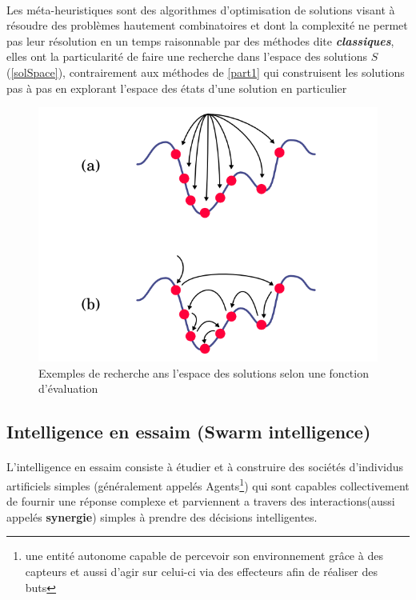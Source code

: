 			\paragraph{}
			Les méta-heuristiques sont des algorithmes d'optimisation de solutions visant à résoudre des problèmes hautement combinatoires et dont la complexité ne permet pas leur résolution en un temps raisonnable par des méthodes dite \textit{\textbf{classiques}}, elles ont la particularité de faire une recherche dans l'espace des solutions $S$(\ref{solSpace}), contrairement aux méthodes de \ref{part1} qui construisent les solutions pas à pas en explorant l'espace des états d'une solution en particulier
			\begin{figure}[H]
				\centering
				\includegraphics[scale=0.25]{images/metHeur.png}
				\caption{Exemples de recherche ans l'espace des solutions selon une fonction d'évaluation}
			\end{figure}
		\noindent
		\subsection{Intelligence en essaim (Swarm intelligence) }
		\paragraph{}
		L'intelligence en essaim consiste à étudier et à construire des sociétés d'individus artificiels simples (généralement appelés Agents\footnote{une entité autonome capable de percevoir son environnement grâce à des capteurs et aussi d'agir sur celui-ci via des effecteurs afin de réaliser des buts}) qui sont capables collectivement de fournir une réponse complexe et parviennent a travers des interactions(aussi appelés \textbf{synergie}) simples à prendre des décisions intelligentes. 
